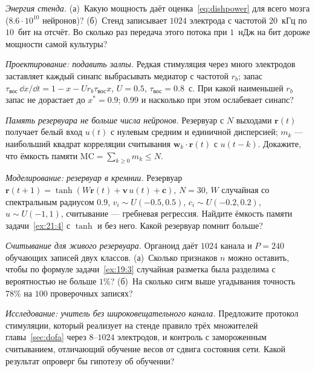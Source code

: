 \begin{exercise}[\lvlA]
\label{ex:21:2}
\emph{Энергия стенда.} (а)~Какую мощность даёт оценка~\eqref{eq:dishpower} для всего мозга ($8.6\cdot10^{10}$ нейронов)? (б)~Стенд записывает $1024$ электрода с частотой $20$~кГц по $10$~бит на отсчёт. Во сколько раз передача этого потока при $1$~нДж на бит дороже мощности самой культуры?
\end{exercise}

\begin{exercise}[\lvlB]
\label{ex:21:3}
\emph{Проектирование: подавить залпы.} Редкая стимуляция через много электродов заставляет каждый синапс выбрасывать медиатор с частотой $r_b$; запас $\tau_{\text{вос}}\,\dd x/\dd t=1-x-Ur_b\tau_{\text{вос}}x$, $U=0.5$, $\tau_{\text{вос}}=0.8$~с. При какой наименьшей $r_b$ запас не дорастает до $x^*=0.9$; $0.99$ и насколько при этом ослабевает синапс?
\end{exercise}

\begin{exercise}[\lvlB]
\label{ex:21:4}
\emph{Память резервуара не больше числа нейронов.} Резервуар с $N$ выходами $\mathbf r(t)$ получает белый вход $u(t)$ с нулевым средним и единичной дисперсией; $m_k$ --- наибольший квадрат корреляции считывания $\mathbf w_k\cdot\mathbf r(t)$ с $u(t-k)$. Докажите, что ёмкость памяти $\mathrm{MC}=\sum_{k\ge0}m_k\le N$.
\end{exercise}

\begin{exercise}[\lvlB]
\label{ex:21:5}
\emph{Моделирование: резервуар в кремнии.} Резервуар $\mathbf r(t+1)=\tanh(W\mathbf r(t)+\mathbf v\,u(t)+\mathbf c)$, $N=30$, $W$ случайная со спектральным радиусом $0.9$, $v_i\sim U(-0.5,0.5)$, $c_i\sim U(-0.2,0.2)$, $u\sim U(-1,1)$, считывание --- гребневая регрессия. Найдите ёмкость памяти задачи~\ref{ex:21:4} с $\tanh$ и без него. Какой резервуар помнит больше?
\end{exercise}

\begin{exercise}[\lvlB]
\label{ex:21:6}
\emph{Считывание для живого резервуара.} Органоид даёт $1024$ канала и $P=240$ обучающих записей двух классов. (а)~Сколько признаков $n$ можно оставить, чтобы по формуле задачи~\ref{ex:19:3} случайная разметка была разделима с вероятностью не больше $1\%$? (б)~На сколько сигм выше угадывания точность $78\%$ на $100$ проверочных записях?
\end{exercise}

\begin{exercise}[\lvlC]
\label{ex:21:7}
\emph{Исследование: учитель без широковещательного канала.} Предложите протокол стимуляции, который реализует на стенде правило трёх множителей главы~\ref{sec:dofa} через $8$--$1024$ электродов, и контроль с замороженным считыванием, отличающий обучение весов от сдвига состояния сети. Какой результат опроверг бы гипотезу об обучении?
\end{exercise}
